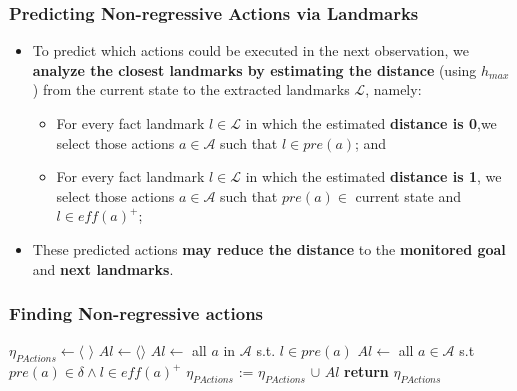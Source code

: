 \documentclass{beamer}
\newcommand{\todo}[1]{ {\color{red} #1} }
\begin{document}
\begin{frame}[c]\frametitle{Predicting Non-regressive Actions via Landmarks}
	\begin{itemize}
		\item To predict which actions could be executed in the next observation, we \textbf{analyze the closest landmarks by estimating the distance} (using $h_{max}$) from the current state to the extracted landmarks $\mathcal{L}$, namely:
			\begin{itemize}
				\item For every fact landmark $l \in \mathcal{L}$ in which the estimated \textbf{distance is 0},we select those actions $a \in \mathcal{A}$ such that $l \in \textit{pre}(a)$; and
				\item For every fact landmark $l \in \mathcal{L}$ in which the estimated \textbf{distance is 1}, we select those actions $a \in \mathcal{A}$ such that $pre(a) \in$ current state and $l \in \textit{eff}(a)^+$;
			\end{itemize}
		\item These predicted actions \textbf{may reduce the distance} to the \textbf{monitored goal} and \textbf{next landmarks}.
	\end{itemize}
\end{frame}

\begin{frame}[c]\frametitle{Finding Non-regressive actions}
    \begin{algorithmic}[1]
        		\State $\eta_{PActions} \gets \langle$ $\rangle$
			 \label{alg:predictiNextActions:for}
				\State $Al \gets \langle \rangle$
            		  \label{alg:predictiNextActions:h0}
            			\State $Al \gets$ all $a$ in $\mathcal{A}$ s.t. $l \in \textit{pre}(a)$ \label{alg:predictiNextActions:now}
				 \label{alg:predictiNextActions:h1}
					\State $Al \gets$ all $a \in \mathcal{A}$ s.t $\textit{pre}(a) \in \delta \land l \in \textit{eff}(a)^+$\label{alg:predictiNextActions:next}
				\EndIf
				\State $\eta_{PActions}$ := $\eta_{PActions}$ $\cup$ $Al$
            \EndFor
            	\State \textbf{return} $\eta_{PActions}$ 
        \EndFunction
    \end{algorithmic}
\end{frame}
\end{document}
